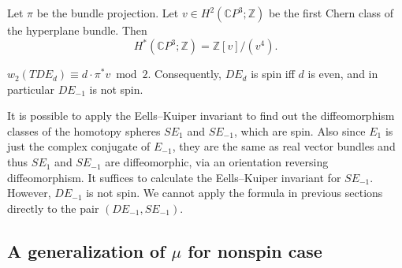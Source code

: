\documentclass[twoside]{article}
\begin{document}



Let $\pi$ be the bundle projection.  Let $v\in H^2(\mathbb{C}P^3;\mathbb{Z})$ be the first Chern class of the hyperplane bundle. Then 
\[
H^*(\mathbb{C}P^3;\mathbb{Z}) = \mathbb{Z}[v]/(v^4). 
\]

\begin{lem}
	$w_2(TDE_{d}) \equiv  d\cdot\pi^*v \bmod 2$. Consequently, $DE_{d}$ is spin iff $d$ is even, and in particular $DE_{-1}$ is not spin. 
\end{lem}

It is possible to apply the Eells--Kuiper invariant to find out the diffeomorphism classes of the homotopy spheres $SE_1$ and $SE_{-1}$, which are spin. Also since $E_1$ is just the complex conjugate of $E_{-1}$, they are the same as real vector bundles and thus $SE_1$ and $SE_{-1}$ are diffeomorphic, via an orientation reversing diffeomorphism. It suffices to calculate the Eells--Kuiper invariant for $SE_{-1}$. However, $DE_{-1}$ is not spin. We cannot apply the formula in previous sections directly to the pair $(DE_{-1},SE_{-1})$. 


















\subsection{A generalization of \texorpdfstring{$\mu$}{mu} for nonspin case}
\end{document}
